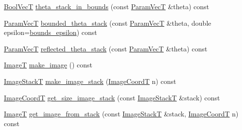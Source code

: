 \begin{DoxyCompactItemize}
\item 
\hyperlink{namespacemappel_a167d761ecce3cafb6f98c00c16bdb523}{Bool\+VecT} \hyperlink{classmappel_1_1PointEmitterModel_a7b6a59b4bc796b440025cffb7a6159f8}{theta\+\_\+stack\+\_\+in\+\_\+bounds} (const \hyperlink{classmappel_1_1PointEmitterModel_add253b568d763f1513a810aac35de719}{Param\+VecT} \&theta) const 
\item 
\hyperlink{classmappel_1_1PointEmitterModel_add253b568d763f1513a810aac35de719}{Param\+VecT} \hyperlink{classmappel_1_1PointEmitterModel_a6671c06d391ae9a09dd5de78dcc636fe}{bounded\+\_\+theta\+\_\+stack} (const \hyperlink{classmappel_1_1PointEmitterModel_add253b568d763f1513a810aac35de719}{Param\+VecT} \&theta, double epsilon=\hyperlink{classmappel_1_1PointEmitterModel_ac987a119137b85a27704b1c40e3fab8c}{bounds\+\_\+epsilon}) const 
\item 
\hyperlink{classmappel_1_1PointEmitterModel_add253b568d763f1513a810aac35de719}{Param\+VecT} \hyperlink{classmappel_1_1PointEmitterModel_ae24c17017ff5e37e1dd9ea9a1aeefa7f}{reflected\+\_\+theta\+\_\+stack} (const \hyperlink{classmappel_1_1PointEmitterModel_add253b568d763f1513a810aac35de719}{Param\+VecT} \&theta) const 
\item 
\hyperlink{classmappel_1_1ImageFormat2DBase_a667ea5016648958e507e7db8eaa041b0}{ImageT} \hyperlink{classmappel_1_1ImageFormat2DBase_ab5d6c4f7f3818f4652fcf8d54351c981}{make\+\_\+image} () const 
\item 
\hyperlink{classmappel_1_1ImageFormat2DBase_a8f0276e94ff242fa4740a718642f5e14}{Image\+StackT} \hyperlink{classmappel_1_1ImageFormat2DBase_a76f8b347ce6c104973dec235398a4f32}{make\+\_\+image\+\_\+stack} (\hyperlink{classmappel_1_1ImageFormat2DBase_a45e9234d63c357f34ca56c72c12b9e9c}{Image\+CoordT} n) const 
\item 
\hyperlink{classmappel_1_1ImageFormat2DBase_a45e9234d63c357f34ca56c72c12b9e9c}{Image\+CoordT} \hyperlink{classmappel_1_1ImageFormat2DBase_a8ac2ce73a9b353b92a688224ccc4d217}{get\+\_\+size\+\_\+image\+\_\+stack} (const \hyperlink{classmappel_1_1ImageFormat2DBase_a8f0276e94ff242fa4740a718642f5e14}{Image\+StackT} \&stack) const 
\item 
\hyperlink{classmappel_1_1ImageFormat2DBase_a667ea5016648958e507e7db8eaa041b0}{ImageT} \hyperlink{classmappel_1_1ImageFormat2DBase_a22701571228f52dd6cfeac72ab18908c}{get\+\_\+image\+\_\+from\+\_\+stack} (const \hyperlink{classmappel_1_1ImageFormat2DBase_a8f0276e94ff242fa4740a718642f5e14}{Image\+StackT} \&stack, \hyperlink{classmappel_1_1ImageFormat2DBase_a45e9234d63c357f34ca56c72c12b9e9c}{Image\+CoordT} n) const 

\end{DoxyCompactItemize}
